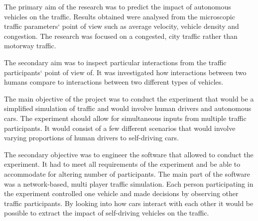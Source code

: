 \documentclass[11pt,english,twoside]{article}
\begin{document}



\par
The primary aim of the research was to predict the impact of autonomous vehicles on the traffic. Results obtained were analysed from the microscopic traffic parameters` point of view such as average velocity, vehicle density and congestion. The research was focused on a congested, city traffic rather than motorway traffic.

\par

The secondary aim was to inspect particular interactions from the traffic participants` point of view of. It was investigated how interactions between two humans compare to interactions between two different types of vehicles.  


\par

The main objective of the project was to conduct the experiment that would be a simplified simulation of traffic and would involve human drivers and autonomous cars. The experiment should allow for simultaneous inputs from multiple traffic participants. It would consist of a few different scenarios that would involve varying proportions of human drivers to self-driving cars. 

\par

The secondary objective was to engineer the software that allowed to conduct the experiment. It had to meet all requirements of the experiment and be able to accommodate for altering number of participants. The main part of the software was a network-based, multi player traffic simulation. Each person participating in the experiment controlled one vehicle and made decisions by observing other traffic participants. By looking into how cars interact with each other it would be possible to extract the impact of self-driving vehicles on the traffic.
\end{document}

